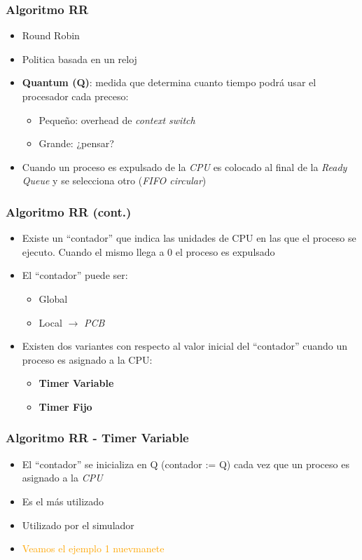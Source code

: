 \begin{frame}
  \frametitle{Algoritmo \textbf{RR}}
  \begin{itemize}
  		\item Round Robin
		\item Politica basada en un reloj
		\item \textbf{Quantum (Q)}: medida que determina cuanto tiempo podrá usar el procesador cada preceso:
		\begin{itemize}
			\item Pequeño: overhead de \textit{context switch}
			\item Grande: ¿pensar?
		\end{itemize}
		\item Cuando un proceso es expulsado de la \textit{CPU} es colocado al final de la \textit{Ready Queue} y se selecciona otro (\textit{FIFO circular})
  \end{itemize}
\end{frame}

\begin{frame}
  \frametitle{Algoritmo \textbf{RR} (cont.)}
  \begin{itemize}
  		\item Existe un ``contador'' que indica las unidades de CPU en las que el proceso se ejecuto. Cuando el mismo llega a 0 el proceso es expulsado
		\item El ``contador'' puede ser:
		\begin{itemize}
			\item Global
			\item Local $\rightarrow$ \textit{PCB}
		\end{itemize}  		
		\item Existen dos variantes con respecto al valor inicial del ``contador'' cuando un proceso es asignado a la CPU:
		\begin{itemize}
			\item \textbf{Timer Variable}
			\item \textbf{Timer Fijo}
		\end{itemize}
  \end{itemize}
\end{frame}

\begin{frame}
  \frametitle{Algoritmo \textbf{RR - Timer Variable}}
  \begin{itemize}
  		\item El ``contador'' se inicializa en Q (contador := Q) cada vez que un proceso es asignado a la \emph{CPU}
		\item Es el más utilizado
		\item Utilizado por el simulador
		\pause
		\item \textcolor{orange}{Veamos el ejemplo 1 nuevmanete}
  \end{itemize}
\end{frame}


